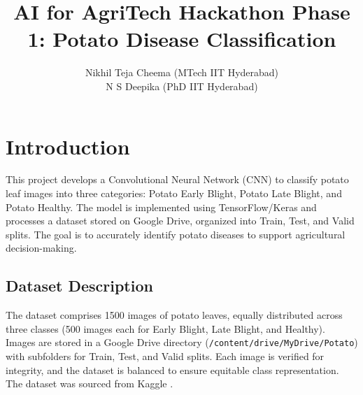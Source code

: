\documentclass{article}
\title{AI for AgriTech Hackathon Phase 1: Potato Disease Classification}
\author{Nikhil Teja Cheema (MTech IIT Hyderabad) \\ N S Deepika (PhD IIT Hyderabad)}
\date{}
\begin{document}
\maketitle

\section{Introduction}
This project develops a Convolutional Neural Network (CNN) to classify potato leaf images into three categories: Potato Early Blight, Potato Late Blight, and Potato Healthy. The model is implemented using TensorFlow/Keras and processes a dataset stored on Google Drive, organized into Train, Test, and Valid splits. The goal is to accurately identify potato diseases to support agricultural decision-making.

\subsection{Dataset Description}
The dataset comprises 1500 images of potato leaves, equally distributed across three classes (500 images each for Early Blight, Late Blight, and Healthy). Images are stored in a Google Drive directory (\texttt{/content/drive/MyDrive/Potato}) with subfolders for Train, Test, and Valid splits. Each image is verified for integrity, and the dataset is balanced to ensure equitable class representation. The dataset was sourced from Kaggle \cite{potato_dataset}.
\end{document}
